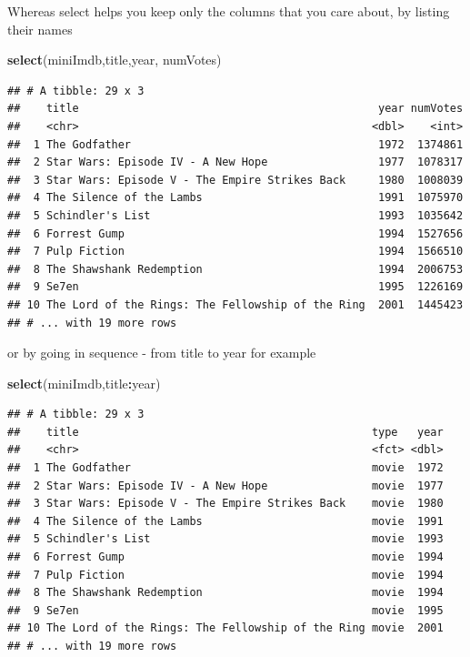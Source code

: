 \documentclass[]{book}
\newenvironment{Shaded}{\begin{snugshade}}{\end{snugshade}}
\newcommand{\KeywordTok}[1]{\textcolor[rgb]{0.13,0.29,0.53}{\textbf{#1}}}
\newcommand{\NormalTok}[1]{#1}
\newcommand{\OperatorTok}[1]{\textcolor[rgb]{0.81,0.36,0.00}{\textbf{#1}}}
\begin{document}
Whereas select helps you keep only the columns that you care about, by listing their names

\begin{Shaded}
\begin{Highlighting}[]
\KeywordTok{select}\NormalTok{(miniImdb,title,year, numVotes)}
\end{Highlighting}
\end{Shaded}

\begin{verbatim}
## # A tibble: 29 x 3
##    title                                              year numVotes
##    <chr>                                             <dbl>    <int>
##  1 The Godfather                                      1972  1374861
##  2 Star Wars: Episode IV - A New Hope                 1977  1078317
##  3 Star Wars: Episode V - The Empire Strikes Back     1980  1008039
##  4 The Silence of the Lambs                           1991  1075970
##  5 Schindler's List                                   1993  1035642
##  6 Forrest Gump                                       1994  1527656
##  7 Pulp Fiction                                       1994  1566510
##  8 The Shawshank Redemption                           1994  2006753
##  9 Se7en                                              1995  1226169
## 10 The Lord of the Rings: The Fellowship of the Ring  2001  1445423
## # ... with 19 more rows
\end{verbatim}

or by going in sequence - from title to year for example

\begin{Shaded}
\begin{Highlighting}[]
\KeywordTok{select}\NormalTok{(miniImdb,title}\OperatorTok{:}\NormalTok{year)}
\end{Highlighting}
\end{Shaded}

\begin{verbatim}
## # A tibble: 29 x 3
##    title                                             type   year
##    <chr>                                             <fct> <dbl>
##  1 The Godfather                                     movie  1972
##  2 Star Wars: Episode IV - A New Hope                movie  1977
##  3 Star Wars: Episode V - The Empire Strikes Back    movie  1980
##  4 The Silence of the Lambs                          movie  1991
##  5 Schindler's List                                  movie  1993
##  6 Forrest Gump                                      movie  1994
##  7 Pulp Fiction                                      movie  1994
##  8 The Shawshank Redemption                          movie  1994
##  9 Se7en                                             movie  1995
## 10 The Lord of the Rings: The Fellowship of the Ring movie  2001
## # ... with 19 more rows
\end{verbatim}
\end{document}
